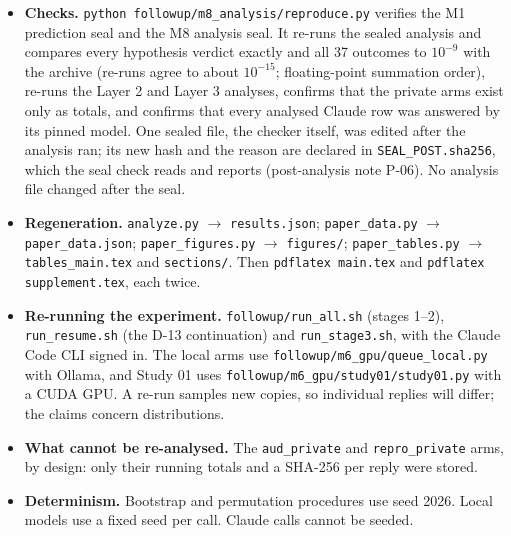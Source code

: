 \begin{itemize}
\item \textbf{Checks.} \texttt{python followup/m8\_analysis/reproduce.py} verifies the M1 prediction seal and the M8
  analysis seal. It re-runs the sealed analysis and compares every hypothesis verdict exactly and all 37 outcomes to
  $10^{-9}$ with the archive (re-runs agree to about $10^{-15}$; floating-point summation order), re-runs the Layer 2
  and Layer 3 analyses, confirms that the private arms exist only as totals, and confirms that every analysed Claude row
  was answered by its pinned model. One sealed file, the checker itself, was edited after the analysis ran; its new hash
  and the reason are declared in \texttt{SEAL\_POST.sha256}, which the seal check reads and reports (post-analysis note
  P-06). No analysis file changed after the seal.
\item \textbf{Regeneration.} \texttt{analyze.py} $\rightarrow$ \texttt{results.json}; \texttt{paper\_data.py}
  $\rightarrow$ \texttt{paper\_data.json}; \texttt{paper\_figures.py} $\rightarrow$ \texttt{figures/};
  \texttt{paper\_tables.py} $\rightarrow$ \texttt{tables\_main.tex} and \texttt{sections/}. Then
  \texttt{pdflatex main.tex} and \texttt{pdflatex supplement.tex}, each twice.
\item \textbf{Re-running the experiment.} \texttt{followup/run\_all.sh} (stages 1--2), \texttt{run\_resume.sh} (the
  D-13 continuation) and \texttt{run\_stage3.sh}, with the Claude Code CLI signed in. The local arms use
  \texttt{followup/m6\_gpu/queue\_local.py} with Ollama, and Study 01 uses \texttt{followup/m6\_gpu/study01/study01.py}
  with a CUDA GPU. A re-run samples new copies, so individual replies will differ; the claims concern distributions.
\item \textbf{What cannot be re-analysed.} The \texttt{aud\_private} and \texttt{repro\_private} arms, by design: only
  their running totals and a SHA-256 per reply were stored.
\item \textbf{Determinism.} Bootstrap and permutation procedures use seed 2026. Local models use a fixed seed per call.
  Claude calls cannot be seeded.
\end{itemize}
